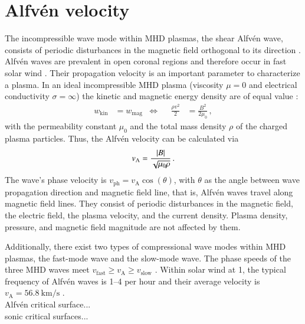 

\section{Alfvén velocity}
\label{sec:alfvén_velocity}
The incompressible wave mode within MHD plasmas, the shear Alfvén wave, consists of periodic disturbances in the magnetic field orthogonal to its direction \citep{Alfven1942}. Alfvén waves are prevalent in open coronal regions and therefore occur in fast solar wind \citep{Cranmer2005}. Their propagation velocity is an important parameter to characterize a plasma. In an ideal incompressible MHD plasma (viscosity $\mu = 0$ and electrical conductivity $\sigma = \infty$) the kinetic and magnetic energy density are of equal value \citep[p.~51]{Kivelson1995}: 
\begin{align*}
	w_\text{kin} &= w_\text{mag}	& \Longleftrightarrow	&	&	\frac{\rho v^2}{2} &= \frac{B^2}{2 \mu_0}	\,,
\end{align*}
with the permeability constant $\mu_0$ and the total mass density $\rho$ of the charged plasma particles. Thus, the Alfvén velocity can be calculated via
\begin{align}
	v_\text{A} = \frac{|B|}{\sqrt{\mu_0 \rho}}	\text{\,.}
\end{align}
The wave's phase velocity is $v_\text{ph} = v_\text{A} \cos(\theta)$, with $\theta$ as the angle between wave propagation direction and magnetic field line, that is, Alfvén waves travel along magnetic field lines. They consist of periodic disturbances in the magnetic field, the electric field, the plasma velocity, and the current density. Plasma density, pressure, and magnetic field magnitude are not affected by them.

Additionally, there exist two types of compressional wave modes within MHD plasmas, the fast-mode wave and the slow-mode wave. The phase speeds of the three MHD waves meet $v_\text{fast} \geq v_\text{A} \geq v_\text{slow}$ \citep[p.~52]{Kivelson1995}. Within solar wind at \SI{1}{\au}, the typical frequency of Alfvén waves is 1--4 per hour and their average velocity is $v_\text{A} = \SI{56.8}{\km\per\s}$ \citep{Veselovsky2010}.\\	%

Alfvén critical surface...\\
sonic critical surfaces...\\

